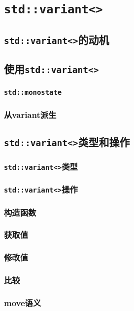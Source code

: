 \section{\texttt{std::variant<>}}\label{ch16}

\subsection{\texttt{std::variant<>}的动机}

\subsection{使用\texttt{std::variant<>}}
\subsubsection*{\texttt{std::monostate}}\label{ch16.2.1}
\subsubsection*{从variant派生}

\subsection{\texttt{std::variant<>}类型和操作}

\subsubsection{\texttt{std::variant<>}类型}

\subsubsection{\texttt{std::variant<>}操作}
\subsubsection*{构造函数}
\subsubsection*{获取值}
\subsubsection*{修改值}
\subsubsection*{比较}
\subsubsection*{move语义}

